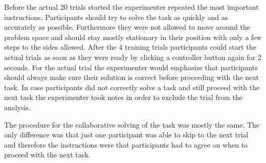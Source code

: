Before the actual 20 trials started the experimenter repeated the most important instructions. Participants should try to solve the task as quickly and as accurately as possible. Furthermore they were not allowed to move around the problem space and should stay mostly stationary in their position with only a few steps to the sides allowed.
After the 4 training trials participants could start the actual trials as soon as they were ready by clicking a controller button again for 2 seconds. For the actual trial the experimenter would emphasize that participants should always make sure their solution is correct before proceeding with the next task. In case participants did not correctly solve a task and still proceed with the next task the experimenter took notes in order to exclude the trial from the analysis.

The procedure for the collaborative solving of the task was mostly the same. The only difference was that just one participant was able to skip to the next trial and therefore the instructions were that participants had to agree on when to proceed with the next task.


